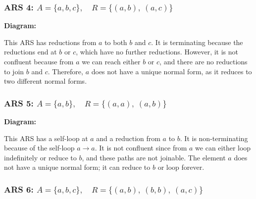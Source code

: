 \documentclass{article}
\theoremstyle{theorem}
\theoremstyle{definition}
\theoremstyle{remark}
\begin{document}
\subsubsection*{ARS 4: \( A = \{a, b, c\},\quad R = \{(a, b),\ (a, c)\} \)}

\textbf{Diagram:}

\begin{center}
\end{center}

This ARS has reductions from \( a \) to both \( b \) and \( c \). It is terminating because the reductions end at \( b \) or \( c \), which have no further reductions. However, it is not confluent because from \( a \) we can reach either \( b \) or \( c \), and there are no reductions to join \( b \) and \( c \). Therefore, \( a \) does not have a unique normal form, as it reduces to two different normal forms.

\subsubsection*{ARS 5: \( A = \{a, b\},\quad R = \{(a, a),\ (a, b)\} \)}

\textbf{Diagram:}

\begin{center}
\end{center}

This ARS has a self-loop at \( a \) and a reduction from \( a \) to \( b \). It is non-terminating because of the self-loop \( a \to a \). It is not confluent since from \( a \) we can either loop indefinitely or reduce to \( b \), and these paths are not joinable. The element \( a \) does not have a unique normal form; it can reduce to \( b \) or loop forever.

\subsubsection*{ARS 6: \( A = \{a, b, c\},\quad R = \{(a, b),\ (b, b),\ (a, c)\} \)}
\end{document}
